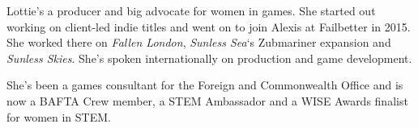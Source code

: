 Lottie’s a producer and big advocate for women in games. She started out working on client-led indie titles and went on to join Alexis at Failbetter in 2015. She worked there on \emph{Fallen London}, \emph{Sunless Sea}‘s Zubmariner expansion and \emph{Sunless Skies}. She’s spoken internationally on production and game development.

She’s been a games consultant for the Foreign and Commonwealth Office and is now a BAFTA Crew member, a STEM Ambassador and a WISE Awards finalist for women in STEM.
